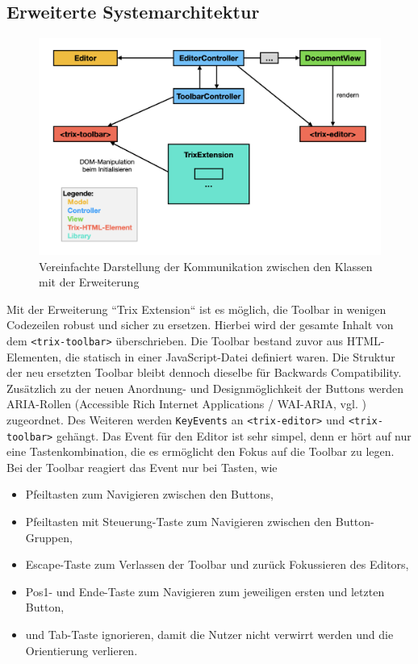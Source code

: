 \subsection{Erweiterte Systemarchitektur}

\begin{figure}[H]
\begin{center}
	\includegraphics[scale=.4]{images/sysarch_extension.png}
\end{center}
	\caption{Vereinfachte Darstellung der Kommunikation zwischen den Klassen mit der Erweiterung}
\end{figure}

Mit der Erweiterung ``Trix Extension`` ist es möglich, die Toolbar in wenigen Codezeilen robust und sicher zu ersetzen. Hierbei wird der gesamte Inhalt von dem \texttt{<trix-toolbar>} überschrieben. Die Toolbar bestand zuvor aus HTML-Elementen, die statisch in einer JavaScript-Datei definiert waren. Die Struktur der neu ersetzten Toolbar bleibt dennoch dieselbe für Backwards Compatibility. Zusätzlich zu der neuen Anordnung- und Designmöglichkeit der Buttons werden ARIA-Rollen (Accessible Rich Internet Applications / WAI-ARIA, vgl. \cite{wai_aria_2017}) zugeordnet. Des Weiteren werden \texttt{KeyEvents} an \texttt{<trix-editor>} und \texttt{<trix-toolbar>} gehängt. Das Event für den Editor ist sehr simpel, denn er hört auf nur eine Tastenkombination, die es ermöglicht den Fokus auf die Toolbar zu legen. Bei der Toolbar reagiert das Event nur bei Tasten, wie

\begin{itemize}
	\item Pfeiltasten zum Navigieren zwischen den Buttons,
	\item Pfeiltasten mit Steuerung-Taste zum Navigieren zwischen den Button-Gruppen,
	\item Escape-Taste zum Verlassen der Toolbar und zurück Fokussieren des Editors,
	\item Pos1- und Ende-Taste zum Navigieren zum jeweiligen ersten und letzten Button,
	\item und Tab-Taste ignorieren, damit die Nutzer nicht verwirrt werden und die Orientierung verlieren.
\end{itemize}

